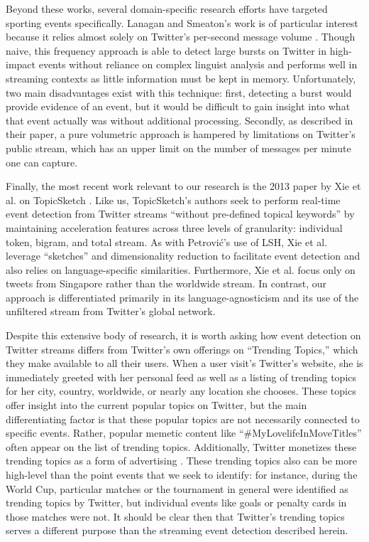 \documentclass{sig-alternate}
\begin{document}
Beyond these works, several domain-specific research efforts have targeted sporting events specifically\cite{vasudevan2013twitter,Zhao2011,lanagan2011using}.
Lanagan and Smeaton's work is of particular interest because it relies almost solely on Twitter's per-second message volume \cite{lanagan2011using}.
Though naive, this frequency approach is able to detect large bursts on Twitter in high-impact events  without reliance on complex linguist analysis and performs well in streaming contexts as little information must be kept in memory.
Unfortunately, two main disadvantages exist with this technique: first, detecting a burst would provide evidence of an event, but it would be difficult to gain insight into what that event actually was without additional processing.
Secondly, as described in their paper, a pure volumetric approach is hampered by limitations on Twitter's public stream, which has an upper limit on the number of messages per minute one can capture.

Finally, the most recent work relevant to our research is the 2013 paper by Xie et al. on TopicSketch \cite{xie2013topicsketch}.
Like us, TopicSketch's authors seek to perform real-time event detection from Twitter streams ``without pre-defined topical keywords'' by maintaining acceleration features across three levels of granularity: individual token, bigram, and total stream.
As with Petrovi\'{c}'s use of LSH, Xie et al. leverage ``sketches'' and dimensionality reduction to facilitate event detection and also relies on language-specific similarities.
Furthermore, Xie et al. focus only on tweets from Singapore rather than the worldwide stream.
In contrast, our approach is differentiated primarily in its language-agnosticism and its use of the unfiltered stream from Twitter's global network.

Despite this extensive body of research, it is worth asking how event detection on Twitter streams differs from Twitter's own offerings on ``Trending Topics,'' which they make available to all their users.
When a user visit's Twitter's website, she is immediately greeted with her personal feed as well as a listing of trending topics for her city, country, worldwide, or nearly any location she chooses.
These topics offer insight into the current popular topics on Twitter, but the main differentiating factor is that these popular topics are not necessarily connected to specific events.
Rather, popular memetic content like ``\#MyLovelifeInMoveTitles'' often appear on the list of trending topics.
Additionally, Twitter monetizes these trending topics as a form of advertising \cite{Sydell2011}.  
These trending topics also can be more high-level than the point events that we seek to identify: for instance, during the World Cup, particular matches or the tournament in general were identified as trending topics by Twitter, but individual events like goals or penalty cards in those matches were not.
It should be clear then that Twitter's trending topics serves a different purpose than the streaming event detection described herein.
\end{document}
